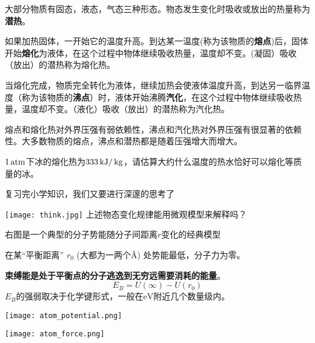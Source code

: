 \documentclass[CJK]{beamer}
\begin{document}
\begin{frame}
\bch
\bitem
\item{大部分物质有固态，液态，气态三种形态。物态发生变化时吸收或放出的热量称为{\bf 潜热}。}
\item{如果加热固体，一开始它的温度升高。到达某一温度(称为该物质的{\bf 熔点})后，固体开始{\bf 熔化}为液体，在这个过程中物体继续吸收热量，温度却不变。{(凝固）吸收（放出）的潜热称为熔化热}。}
\item{当熔化完成，物质完全转化为液体，继续加热会使液体温度升高，到达另一临界温度（称为该物质的{\bf 沸点}）时，液体开始沸腾{\bf 汽化}，在这个过程中物体继续吸收热量，温度却不变。{（液化）吸收（放出）的潜热称为汽化热}。}
\item{ 熔点和熔化热对外界压强有弱依赖性，沸点和汽化热对外界压强有很显著的依赖性。大多数物质的熔点，沸点和潜热都是随着压强增大而增大。}
\eitem
\ech
\end{frame}

\begin{frame}
\bch
$1\,\mathrm{atm}$下冰的熔化热为$333 \,\mathrm{kJ}/\,\mathrm{kg}$，请估算大约什么温度的热水恰好可以熔化等质量的冰。
\ech
\end{frame}


\begin{frame}
\bch

复习完小学知识，我们又要进行深邃的思考了

\bcenter
\texttt{[image: think.jpg]}
\ecenter
上述物态变化规律能用微观模型来解释吗？
\ech
\end{frame}

\begin{frame}
\bch

{\small
右图是一个典型的分子势能随分子间距离$r$变化的经典模型

在某“平衡距离” $r_0$ (大都为一两个\AA) 处势能最低，分子力为零。

{\bf 束缚能是处于平衡点的分子逃逸到无穷远需要消耗的能量}。
$$E_B = U(\infty) - U(r_0) $$
$E_B$的强弱取决于化学键形式，一般在$\mathrm{eV}$附近几个数量级内。}
\emini
\hspace{0.2in}

\texttt{[image: atom\_potential.png]}

\vspace{0.05in}

\texttt{[image: atom\_force.png]}
\emini
\ech
\end{frame}
\end{document}
